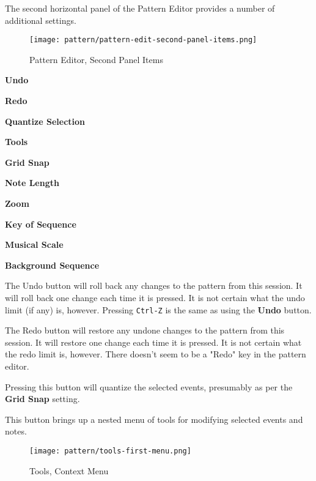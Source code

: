    The second horizontal panel of the Pattern Editor provides a number
   of additional settings.

\begin{figure}[H]
   \centering 
   \texttt{[image: pattern/pattern-edit-second-panel-items.png]}
   \caption{Pattern Editor, Second Panel Items}
   \label{fig:pattern_editor_main_panel_items}
\end{figure}

   \begin{enumber}
      \item \textbf{Undo}
      \item \textbf{Redo}
      \item \textbf{Quantize Selection}
      \item \textbf{Tools}
      \item \textbf{Grid Snap}
      \item \textbf{Note Length}
      \item \textbf{Zoom}
      \item \textbf{Key of Sequence}
      \item \textbf{Musical Scale}
      \item \textbf{Background Sequence}
   \end{enumber}

   \setcounter{ItemCounter}{0}      %

   The Undo button will roll back any changes to the pattern from this
   session.
   It will roll back one change each time it is pressed.
   It is not certain what the undo limit (if any) is, however.
   Pressing \texttt{Ctrl-Z} is the same as using the \textbf{Undo} button.

   The Redo button will restore any undone changes to the pattern from this
   session.
   It will restore one change each time it is pressed.
   It is not certain what the redo limit is, however.
   There doesn't seem to be a "Redo" key in the pattern editor.

   Pressing this button will quantize the selected events, presumably as per
   the \textbf{Grid Snap} setting.

   This button brings up a nested menu of tools for modifying selected
   events and notes.

\begin{figure}[H]
   \centering 
   \texttt{[image: pattern/tools-first-menu.png]}
   \caption{Tools, Context Menu}
   \label{fig:pattern_editor_tools_first_menu}
\end{figure}

